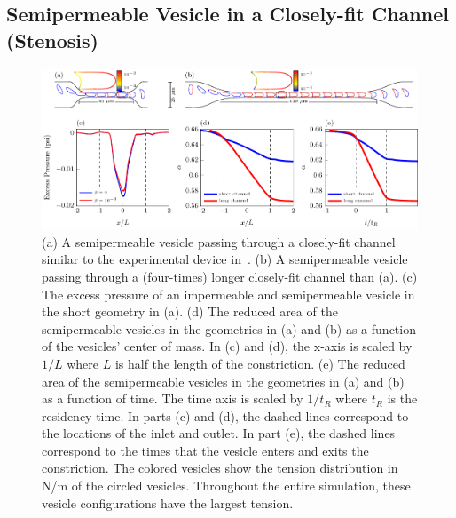 \documentclass[prb,preprint,showpacs,preprintnumbers,amsmath,amssymb,longbibliography]{revtex4-1}
\newif\ifTikz
\begin{document}
\subsection{Semipermeable Vesicle in a Closely-fit Channel (Stenosis)}
 \begin{figure}[hbp]
  \centering
  \ifTikz
  
  \else
  \includegraphics{figures/stenosisComposite.pdf}
  \fi
  \caption{\label{fig:stenosisComposite} (a) A semipermeable vesicle
   passing through a closely-fit channel similar to the experimental
   device in~\cite{abk-fai-sto2006}. (b) A semipermeable vesicle passing
   through a  (four-times) longer closely-fit channel than (a). (c) The
   excess pressure of an impermeable and semipermeable vesicle in the
   short geometry in (a). (d) The reduced area of the semipermeable
   vesicles in the geometries in (a) and (b) as a function of the
   vesicles' center of mass. In (c) and (d), the x-axis is scaled by
   $1/L$ where $L$ is half the length of the constriction. (e) The
   reduced area of the semipermeable vesicles in the geometries in (a)
   and (b) as a function of time. The time axis is scaled by $1/t_R$
   where $t_R$ is the residency time. In parts (c) and (d), the dashed
   lines correspond to the locations of the inlet and outlet. In part
   (e), the dashed lines correspond to the times that the vesicle enters
   and exits the constriction. The colored vesicles show the tension
   distribution in N/m of the circled vesicles. Throughout the entire
   simulation, these vesicle configurations have the largest tension.}
\end{figure}
\end{document}
